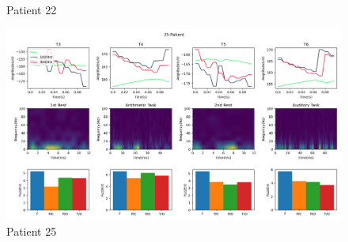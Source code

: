 \documentclass[10pt]{article}
\begin{document}
\begin{landscape}
\begin{figure}
  \caption{Patient 22}
  \label{fig:patient_22}
\end{figure}
\clearpage
\begin{figure}
  \includegraphics[width=7.2in]{figures/25.png}
  \caption{Patient 25}
  \label{fig:patient_25}
\end{figure}
\end{landscape}
\end{document}

